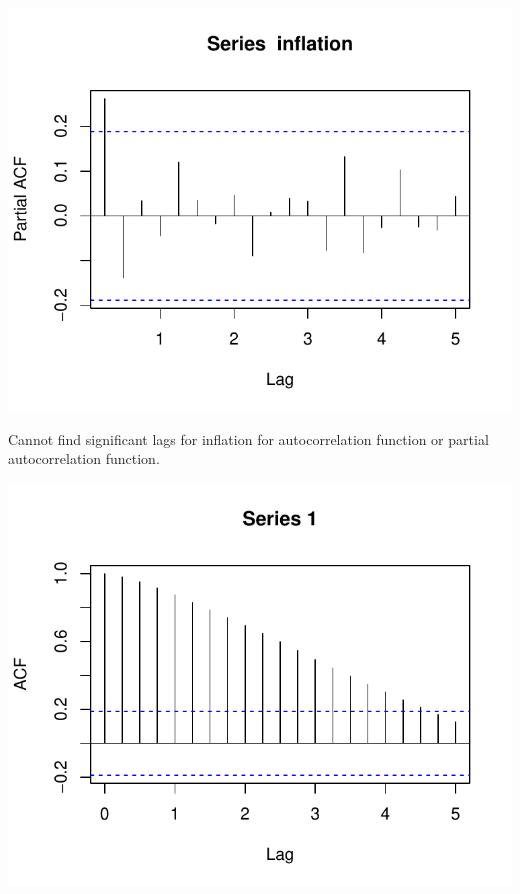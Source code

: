 \documentclass[11pt,preprint, authoryear]{elsarticle}
\numberwithin{equation}{section}
\numberwithin{figure}{section}
\numberwithin{table}{section}
\begin{document}
\begin{center}\includegraphics{README_files/figure-latex/unnamed-chunk-30-2} \end{center}

Cannot find significant lags for inflation for autocorrelation function
or partial autocorrelation function.

\begin{center}\includegraphics{README_files/figure-latex/unnamed-chunk-31-1} \end{center}
\end{document}
